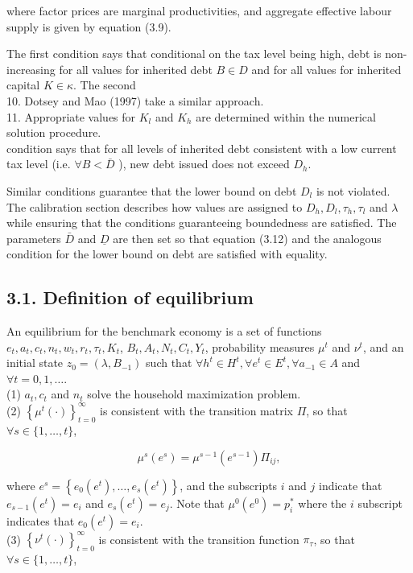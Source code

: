 \documentclass[11pt]{article}
\begin{document}
where factor prices are marginal productivities, and aggregate effective labour supply is given by equation (3.9).

The first condition says that conditional on the tax level being high, debt is non-increasing for all values for inherited debt $B \in D$ and for all values for inherited capital $K \in \kappa$. The second\\
10. Dotsey and Mao (1997) take a similar approach.\\
11. Appropriate values for $K_{l}$ and $K_{h}$ are determined within the numerical solution procedure.\\
condition says that for all levels of inherited debt consistent with a low current tax level (i.e. $\forall B<\bar{D}$ ), new debt issued does not exceed $D_{h}$.

Similar conditions guarantee that the lower bound on debt $D_{l}$ is not violated. The calibration section describes how values are assigned to $D_{h}, D_{l}, \tau_{h}, \tau_{l}$ and $\lambda$ while ensuring that the conditions guaranteeing boundedness are satisfied. The parameters $\bar{D}$ and $\underline{D}$ are then set so that equation (3.12) and the analogous condition for the lower bound on debt are satisfied with equality.

\subsection*{3.1. Definition of equilibrium}
An equilibrium for the benchmark economy is a set of functions $e_{t}, a_{t}, c_{t}, n_{t}, w_{t}, r_{t}, \tau_{t}, K_{t}$, $B_{t}, A_{t}, N_{t}, C_{t}, Y_{t}$, probability measures $\mu^{t}$ and $\nu^{t}$, and an initial state $z_{0}=\left(\lambda, B_{-1}\right)$ such that $\forall h^{t} \in H^{t}, \forall e^{t} \in E^{t}, \forall a_{-1} \in A$ and $\forall t=0,1, \ldots$.\\
(1) $a_{t}, c_{t}$ and $n_{t}$ solve the household maximization problem.\\
(2) $\left\{\mu^{t}(\cdot)\right\}_{t=0}^{\infty}$ is consistent with the transition matrix $\Pi$, so that $\forall s \in\{1, \ldots, t\}$,

$$
\mu^{s}\left(e^{s}\right)=\mu^{s-1}\left(e^{s-1}\right) \Pi_{i j},
$$

where $e^{s}=\left\{e_{0}\left(e^{t}\right), \ldots, e_{s}\left(e^{t}\right)\right\}$, and the subscripts $i$ and $j$ indicate that $e_{s-1}\left(e^{t}\right)=e_{i}$ and $e_{s}\left(e^{t}\right)=e_{j}$. Note that $\mu^{0}\left(e^{0}\right)=p_{i}^{*}$ where the $i$ subscript indicates that $e_{0}\left(e^{t}\right)=e_{i}$.\\
(3) $\left\{\nu^{t}(\cdot)\right\}_{t=0}^{\infty}$ is consistent with the transition function $\pi_{\tau}$, so that $\forall s \in\{1, \ldots, t\}$,
\end{document}
